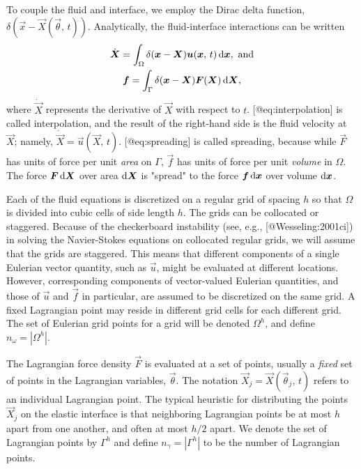 To couple the fluid and interface, we employ the Dirac delta function,
$\delta(\vec{x}-\vec{X}(\vec{\theta},\,t))$. Analytically, the fluid-interface
interactions can be written
\begin{gather}
    \label{eq:interpolation}
    \dot{\vec{X}} = \int_\Omega \delta(\vec{x}-\vec{X}) \vec{u}(\vec{x},\,t)\d\vec{x},\ \text{and} \\
    \label{eq:spreading}
    \vec{f} = \int_\Gamma \delta(\vec{x}-\vec{X})\vec{F}(\vec{X})\d\vec{X},
\end{gather}
where $\dot{\vec{X}}$ represents the derivative of $\vec{X}$ with respect to
$t$. [@eq:interpolation] is called interpolation, and the result of the
right-hand side is the fluid velocity at $\vec{X}$; namely, $\dot{\vec{X}}
= \vec{u}(\vec{X},\,t)$. [@eq:spreading] is called spreading, because while
$\vec{F}$ has units of force per unit \emph{area} on $\Gamma$, $\vec{f}$ has
units of force per unit \emph{volume} in $\Omega$. The force $\vec{F}\d\vec{X}$
over area $\d\vec{X}$ is "spread" to the force $\vec{f}\d\vec{x}$ over volume
$\d\vec{x}$. 

Each of the fluid equations is discretized on a regular grid of spacing $h$ so
that $\Omega$ is divided into cubic cells of side length $h$. The grids can be
collocated or staggered. Because of the checkerboard instability (see, e.g.,
[@Wesseling:2001ci]) in solving the Navier-Stokes equations on collocated
regular grids, we will assume that the grids are staggered. This means that
different components of a single Eulerian vector quantity, such as $\vec{u}$,
might be evaluated at different locations. However, corresponding components of
vector-valued Eulerian quantities, and those of $\vec{u}$ and $\vec{f}$ in
particular, are assumed to be discretized on the same grid. A fixed Lagrangian
point may reside in different grid cells for each different grid. The set of
Eulerian grid points for a grid will be denoted $\Omega^h$, and define
$n_\omega = |\Omega^h|$.

The Lagrangian force density $\vec{F}$ is evaluated at a set of points,
usually a \emph{fixed} set of points in the Lagrangian variables,
$\vec{\theta}$.  The notation $\vec{X}_j=\vec{X}(\vec{\theta}_j,\,t)$ refers to
an individual Lagrangian point. The typical heuristic for distributing the
points $\vec{X}_j$ on the elastic interface is that neighboring Lagrangian
points be at most $h$ apart from one another, and often at most $h/2$ apart. We
denote the set of Lagrangian points by $\Gamma^h$ and define $n_\gamma =
|\Gamma^h|$ to be the number of Lagrangian points.

